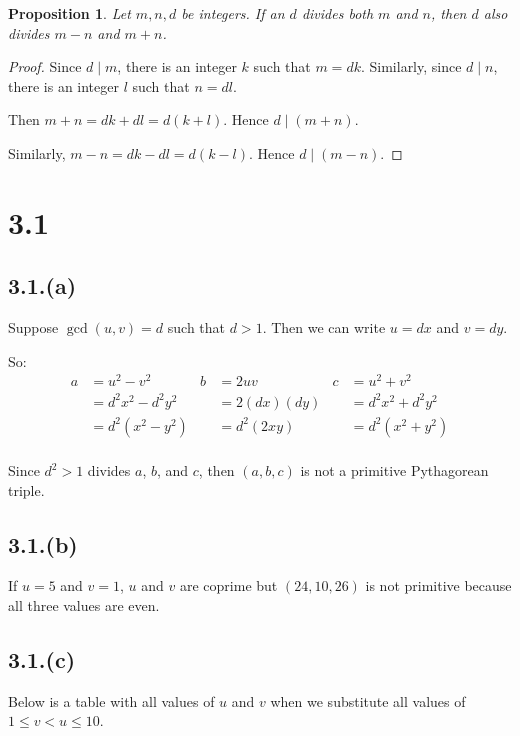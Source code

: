 \documentclass[letterpaper, 12pt]{memoir}
\theoremstyle{mystyle}
\newtheorem*{prop}{Proposition}
\begin{document}
\begin{prop}
    Let $m,n, d$ be integers. If an $d$ divides both $m$ and $n$, then $d$ also
    divides $m-n$ and $m+n$.
\end{prop}

\begin{proof}
    Since $d \mid m$, there is an integer $k$ such that $m = dk$. Similarly,
    since $d \mid n$, there is an integer $l$ such that $n = dl$.
    
    Then $m+n = dk+dl = d(k+l)$. Hence $d \mid (m+n)$.
    
    Similarly, $m-n = dk-dl = d(k-l)$. Hence $d \mid (m-n)$.
\end{proof}


\section*{3.1}

\subsection*{3.1.(a)}
Suppose $\gcd(u,v) = d$ such that $d > 1$. Then we can write $u = dx$ and 
$v = dy$.

So:
\begin{align*}
    a &= u^2 - v^2          & b &= 2uv          & c &= u^2 + v^2\\
      &= d^2 x^2 - d^2 y^2  &   &= 2(dx)(dy)    &   &= d^2 x^2 + d^2 y^2\\
      &= d^2(x^2 - y^2)     &   &= d^2 (2xy)    &   &= d^2 (x^2 + y^2) \\
\end{align*}

Since $d^2 > 1$ divides $a$, $b$, and $c$, then $(a,b,c)$ is not a primitive
Pythagorean triple.

\subsection*{3.1.(b)}
If $u = 5$ and $v = 1$, $u$ and $v$ are coprime but $(24, 10, 26)$ is not 
primitive because all three values are even.

\subsection*{3.1.(c)}
Below is a table with all values of $u$ and $v$ when we substitute all values
of ${1 \leq v < u \leq 10}$.
\end{document}
